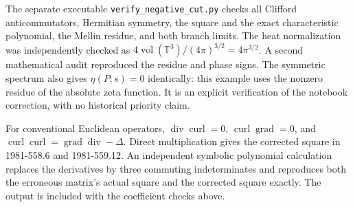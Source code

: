 \begin{remark}\oursComputed
The separate executable \texttt{verify\_negative\_cut.py} checks all
Clifford anticommutators, Hermitian symmetry, the square and the exact
characteristic polynomial, the Mellin residue, and both branch limits.
The heat normalization was independently checked as
\(4\operatorname{vol}(\mathbb T^3)/(4\pi)^{3/2}=4\pi^{3/2}\).
A second mathematical audit reproduced the residue and phase signs.
The symmetric spectrum also gives \(\eta(P;s)=0\) identically:
this example uses the nonzero residue of the absolute zeta function.
It is an explicit verification of the notebook correction, with no
historical priority claim.
\end{remark}

\begin{remark}\oursComputed
For conventional Euclidean operators,
\(\operatorname{div}\operatorname{curl}=0\),
\(\operatorname{curl}\operatorname{grad}=0\), and
\(\operatorname{curl}\operatorname{curl}
=\operatorname{grad}\operatorname{div}-\Delta\).
Direct multiplication gives the corrected square in 1981-558.6 and
1981-559.12. An independent symbolic polynomial calculation replaces
the derivatives by three commuting indeterminates and reproduces both
the erroneous matrix's actual square and the corrected square exactly.
The output is included with the coefficient checks above.
\end{remark}
